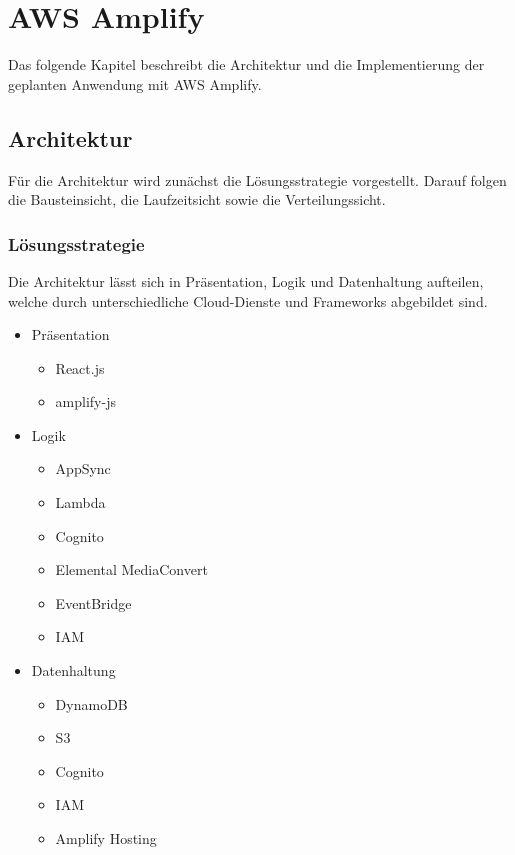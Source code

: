 \chapter{AWS Amplify}
\label{kap4}

Das folgende Kapitel beschreibt die Architektur und die Implementierung der geplanten Anwendung mit AWS Amplify.

\section{Architektur}

Für die Architektur wird zunächst die Lösungsstrategie vorgestellt. Darauf folgen die Bausteinsicht, die Laufzeitsicht sowie die Verteilungssicht.

\subsection{Lösungsstrategie}

Die Architektur lässt sich in Präsentation, Logik und Datenhaltung aufteilen, welche durch unterschiedliche Cloud-Dienste und Frameworks abgebildet sind.
\begin{itemize}
  \item Präsentation
    \begin{itemize}
      \item React.js
      \item amplify-js
    \end{itemize}
  \item Logik
    \begin{itemize}
      \item AppSync
      \item Lambda
      \item Cognito
      \item Elemental MediaConvert
      \item EventBridge
      \item IAM
    \end{itemize}
  \item Datenhaltung
    \begin{itemize}
      \item DynamoDB
      \item S3
      \item Cognito
      \item IAM
      \item Amplify Hosting
    \end{itemize}
\end{itemize}

